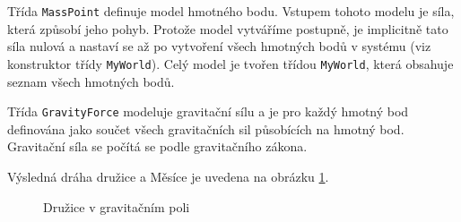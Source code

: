 \documentclass[a4paper]{article}
\begin{document}
Třída \verb|MassPoint| definuje model hmotného bodu. Vstupem tohoto modelu je
síla, která způsobí jeho pohyb. Protože model vytváříme postupně, je
implicitně tato síla nulová a nastaví se až po vytvoření všech hmotných bodů v
systému (viz konstruktor třídy \verb|MyWorld|). Celý model je tvořen třídou
\verb|MyWorld|,
která obsahuje seznam všech hmotných bodů.

Třída \verb|GravityForce| modeluje gravitační sílu a je pro každý hmotný bod
definována jako součet všech gravitačních sil působících na hmotný bod.
Gravitační síla se počítá se podle gravitačního zákona.

Výsledná dráha družice a Měsíce je uvedena na obrázku \ref{druzice}.

\begin{figure}[ht]
  \begin{center}
    \caption{Družice v gravitačním poli}
    \label{druzice}
  \end{center}
\end{figure}

\end{document}
